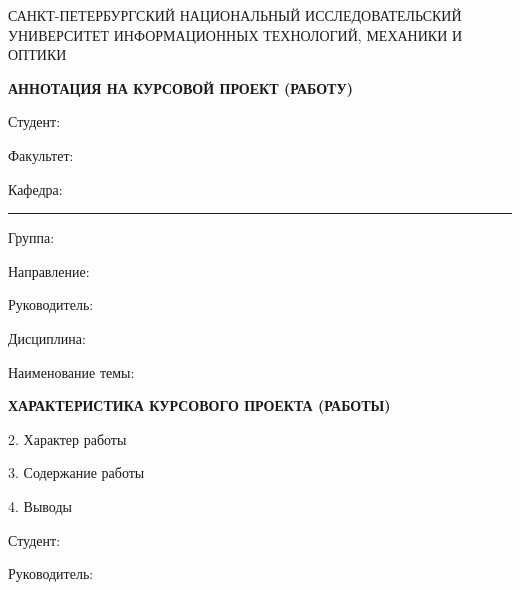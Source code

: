 \thispagestyle{empty}


\begin{center}
{\small САНКТ-ПЕТЕРБУРГСКИЙ НАЦИОНАЛЬНЫЙ ИССЛЕДОВАТЕЛЬСКИЙ УНИВЕРСИТЕТ ИНФОРМАЦИОННЫХ ТЕХНОЛОГИЙ, МЕХАНИКИ И ОПТИКИ}

\textbf{АННОТАЦИЯ НА КУРСОВОЙ ПРОЕКТ (РАБОТУ)}
\end{center}

Студент:  

Факультет: 

Кафедра: \rule{10em}{.1pt} Группа: 

Направление:  

Руководитель: 

Дисциплина: 

\hrulefill

Наименование темы: 

\hrulefill

\begin{center}
\textbf{ХАРАКТЕРИСТИКА КУРСОВОГО ПРОЕКТА (РАБОТЫ)}
\end{center}

\hrulefill

\hrulefill

\hrulefill

\hrulefill

2. Характер работы

3. Содержание работы

\hrulefill

\hrulefill

\hrulefill

\hrulefill

\hrulefill

4. Выводы

\hrulefill

\hrulefill

\hrulefill

\hrulefill

Студент: \hrulefill

Руководитель: \hrulefill


